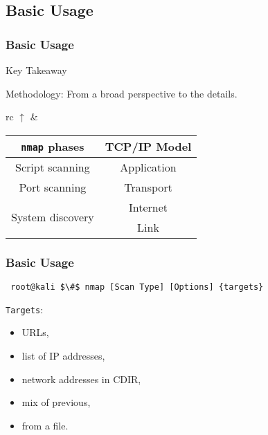 \documentclass[aspectratio=169,xcolor=dvipsnames]{beamer}
\begin{document}
\subsection{Basic Usage}
\begin{frame}[fragile]

    \frametitle{Basic Usage}

    \begin{exampleblock}{Key Takeaway}
        \begin{center}
            Methodology: From a broad perspective to the details.
        \end{center}
    \end{exampleblock}

    \pause

    \begin{center}
        \begin{tabular}{rc}
            \Huge$\uparrow$ & 
            \begin{tabular}{cc}
                \textbf{\texttt{nmap} phases} & \textbf{TCP/IP Model}\\ \hline
                Script scanning & Application \\ \hline
                Port scanning & Transport \\ \hline
                \multirow{2}{*}{System discovery} & Internet\\ \cline{2-2}
                & Link \\ \hline
            \end{tabular}
        \end{tabular}
    \end{center}

\end{frame}

\begin{frame}[fragile]
    \frametitle{Basic Usage}

    \begin{lstlisting}
 root@kali $\#$ nmap [Scan Type] [Options] {targets}
    \end{lstlisting}

    \texttt{Targets}:

    \begin{itemize}
        \item URLs,
        \item list of IP addresses,
        \item network addresses in CDIR,
        \item mix of previous,
        \item from a file.
    \end{itemize}

\end{frame}
\end{document}
